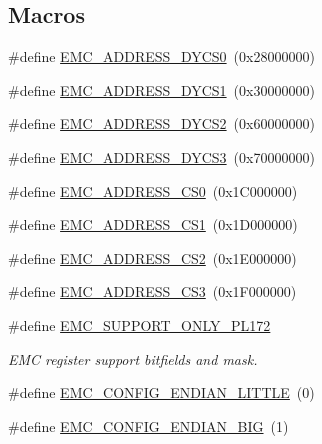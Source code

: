 \subsection*{Macros}
\begin{DoxyCompactItemize}
\item 
\#define \hyperlink{group___e_m_c__18_x_x__43_x_x_gaefabc84f3652e1bea098a5a2c4d2bba7}{E\+M\+C\+\_\+\+A\+D\+D\+R\+E\+S\+S\+\_\+\+D\+Y\+C\+S0}~(0x28000000)
\item 
\#define \hyperlink{group___e_m_c__18_x_x__43_x_x_gad99ea901e664ef1be28e4864d8015888}{E\+M\+C\+\_\+\+A\+D\+D\+R\+E\+S\+S\+\_\+\+D\+Y\+C\+S1}~(0x30000000)
\item 
\#define \hyperlink{group___e_m_c__18_x_x__43_x_x_gaba0163f1b4a091ec23b7e2523dd126dc}{E\+M\+C\+\_\+\+A\+D\+D\+R\+E\+S\+S\+\_\+\+D\+Y\+C\+S2}~(0x60000000)
\item 
\#define \hyperlink{group___e_m_c__18_x_x__43_x_x_ga5821429ee664a6885f494cf951085b4a}{E\+M\+C\+\_\+\+A\+D\+D\+R\+E\+S\+S\+\_\+\+D\+Y\+C\+S3}~(0x70000000)
\item 
\#define \hyperlink{group___e_m_c__18_x_x__43_x_x_ga128f03ce6dd1a7f821d0ab1a53e11ac4}{E\+M\+C\+\_\+\+A\+D\+D\+R\+E\+S\+S\+\_\+\+C\+S0}~(0x1\+C000000)
\item 
\#define \hyperlink{group___e_m_c__18_x_x__43_x_x_ga46923aa8eb0091747c2bb16bbb801b4c}{E\+M\+C\+\_\+\+A\+D\+D\+R\+E\+S\+S\+\_\+\+C\+S1}~(0x1\+D000000)
\item 
\#define \hyperlink{group___e_m_c__18_x_x__43_x_x_ga75f1c0adaf16b406c3ff78bb872365e1}{E\+M\+C\+\_\+\+A\+D\+D\+R\+E\+S\+S\+\_\+\+C\+S2}~(0x1\+E000000)
\item 
\#define \hyperlink{group___e_m_c__18_x_x__43_x_x_ga6e968a46ed51863a410b7069858be043}{E\+M\+C\+\_\+\+A\+D\+D\+R\+E\+S\+S\+\_\+\+C\+S3}~(0x1\+F000000)
\item 
\#define \hyperlink{group___e_m_c__18_x_x__43_x_x_ga71bcb83ea9d85aa3cdced2b2200fcd1b}{E\+M\+C\+\_\+\+S\+U\+P\+P\+O\+R\+T\+\_\+\+O\+N\+L\+Y\+\_\+\+P\+L172}
\begin{DoxyCompactList}\small\item\em E\+MC register support bitfields and mask. \end{DoxyCompactList}\item 
\#define \hyperlink{group___e_m_c__18_x_x__43_x_x_ga462cbdd5923b1b220243f96570af6974}{E\+M\+C\+\_\+\+C\+O\+N\+F\+I\+G\+\_\+\+E\+N\+D\+I\+A\+N\+\_\+\+L\+I\+T\+T\+LE}~(0)
\item 
\#define \hyperlink{group___e_m_c__18_x_x__43_x_x_ga7ac66f11798aef973174c398d877d0bf}{E\+M\+C\+\_\+\+C\+O\+N\+F\+I\+G\+\_\+\+E\+N\+D\+I\+A\+N\+\_\+\+B\+IG}~(1)

\end{DoxyCompactItemize}

